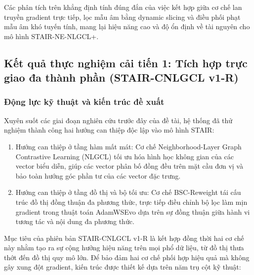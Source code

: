 Các phân tích trên khẳng định tính đúng đắn của việc kết hợp giữa cơ chế lan truyền gradient trực tiếp, lọc mẫu âm bằng dynamic slicing và điều phối phạt mẫu âm khó tuyến tính, mang lại hiệu năng cao và độ ổn định về tài nguyên cho mô hình STAIR-NE-NLGCL+.

\subsection{Kết quả thực nghiệm cải tiến 1: Tích hợp trực giao đa thành phần (STAIR-CNLGCL v1-R)}
\label{sec:stair_cnlgcl_v1_r}

\subsubsection{Động lực kỹ thuật và kiến trúc đề xuất}

Xuyên suốt các giai đoạn nghiên cứu trước đây của đề tài, hệ thống đã thử nghiệm thành công hai hướng can thiệp độc lập vào mô hình STAIR:
\begin{enumerate}[leftmargin=*]
    \item Hướng can thiệp ở tầng hàm mất mát: Cơ chế Neighborhood-Layer Graph Contrastive Learning (NLGCL) tối ưu hóa hình học không gian của các vector biểu diễn, giúp các vector phân bố đồng đều trên mặt cầu đơn vị và bảo toàn hướng góc phần tư của các vector đặc trưng.
    \item Hướng can thiệp ở tầng đồ thị và bộ tối ưu: Cơ chế BSC-Reweight tái cấu trúc đồ thị đồng thuận đa phương thức, trực tiếp điều chỉnh bộ lọc làm mịn gradient trong thuật toán AdamWSEvo dựa trên sự đồng thuận giữa hành vi tương tác và nội dung đa phương thức.
\end{enumerate}

Mục tiêu của phiên bản STAIR-CNLGCL v1-R là kết hợp đồng thời hai cơ chế này nhằm tạo ra sự cộng hưởng hiệu năng trên mọi phổ dữ liệu, từ đồ thị thưa thớt đến đồ thị quy mô lớn. Để bảo đảm hai cơ chế phối hợp hiệu quả mà không gây xung đột gradient, kiến trúc được thiết kế dựa trên năm trụ cột kỹ thuật:

